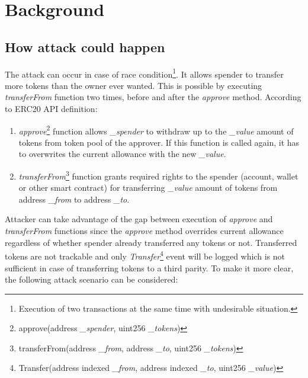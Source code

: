 
\section{Background}

\subsection{How attack could happen}






The attack can occur in case of race condition\footnote{Execution of two transactions at the same time with undesirable situation.}. It allows spender to transfer more tokens than the owner ever wanted. This is possible by executing \textit{transferFrom} function two times, before and after the \textit{approve} method. According to ERC20 API definition:
\begin{enumerate}
	\item \textit{approve}\footnote{approve(address \textit{\_spender}, uint256 \textit{\_tokens})} function allows \textit{\_spender} to withdraw up to the \textit{\_value} amount of tokens from token pool of the approver. If this function is called again, it has to overwrites the current allowance with the new \textit{\_value}.
	\item \textit{transferFrom}\footnote{transferFrom(address \textit{\_from}, address \textit{\_to}, uint256 \textit{\_tokens})} function grants required rights to the spender (account, wallet or other smart contract) for transferring \textit{\_value} amount of tokens from address \textit{\_from} to address \textit{\_to}.
\end{enumerate}
Attacker can take advantage of the gap between execution of \textit{approve} and \textit{transferFrom} functions since the \textit{approve} method overrides current allowance regardless of whether spender already transferred any tokens or not. Transferred tokens are not trackable and only \textit{Transfer}\footnote{Transfer(address indexed \textit{\_from}, address indexed \textit{\_to}, uint256 \textit{\_value})} event will be logged which is not sufficient in case of transferring tokens to a third parity. To make it more clear, the following attack scenario can be considered:
